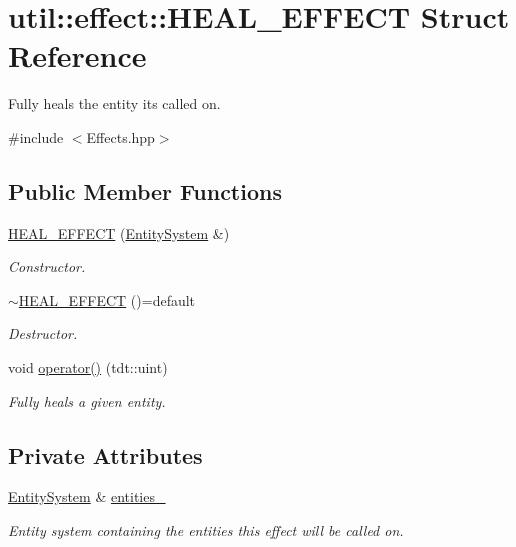 \hypertarget{structutil_1_1effect_1_1_h_e_a_l___e_f_f_e_c_t}{}\section{util\+:\+:effect\+:\+:H\+E\+A\+L\+\_\+\+E\+F\+F\+E\+CT Struct Reference}
\label{structutil_1_1effect_1_1_h_e_a_l___e_f_f_e_c_t}


Fully heals the entity it\textquotesingle{}s called on.  




{\ttfamily \#include $<$Effects.\+hpp$>$}

\subsection*{Public Member Functions}
\begin{DoxyCompactItemize}
\item 
\hyperlink{structutil_1_1effect_1_1_h_e_a_l___e_f_f_e_c_t_ac34dbe9273e3b9d4be6cd79932c8cf1e}{H\+E\+A\+L\+\_\+\+E\+F\+F\+E\+CT} (\hyperlink{class_entity_system}{Entity\+System} \&)
\begin{DoxyCompactList}\small\item\em Constructor. \end{DoxyCompactList}\item 
\hyperlink{structutil_1_1effect_1_1_h_e_a_l___e_f_f_e_c_t_ac0ab236d3a4c96517de10051d7d140fd}{$\sim$\+H\+E\+A\+L\+\_\+\+E\+F\+F\+E\+CT} ()=default
\begin{DoxyCompactList}\small\item\em Destructor. \end{DoxyCompactList}\item 
void \hyperlink{structutil_1_1effect_1_1_h_e_a_l___e_f_f_e_c_t_a832e397aafe403970d73e480b29c5004}{operator()} (tdt\+::uint)
\begin{DoxyCompactList}\small\item\em Fully heals a given entity. \end{DoxyCompactList}\end{DoxyCompactItemize}
\subsection*{Private Attributes}
\begin{DoxyCompactItemize}
\item 
\hyperlink{class_entity_system}{Entity\+System} \& \hyperlink{structutil_1_1effect_1_1_h_e_a_l___e_f_f_e_c_t_a6e7bfe3f3e1605de6bbb52f21de56b49}{entities\+\_\+}
\begin{DoxyCompactList}\small\item\em Entity system containing the entities this effect will be called on. \end{DoxyCompactList}\end{DoxyCompactItemize}


